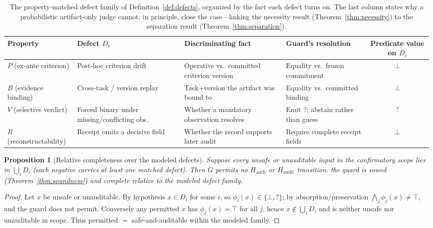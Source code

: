 \documentclass[sigconf,anonymous,review]{acmart}
\newtheorem{proposition}{Proposition}
\begin{document}
\begin{table}[t]
\centering
\footnotesize
\caption{The property-matched defect family of Definition~\ref{def:defects}, organized by the fact each defect turns on. The last column states why a probabilistic artifact-only judge cannot, in principle, close the case---linking the necessity result (Theorem~\ref{thm:necessity}) to the separation result (Theorem~\ref{thm:separation}).}
\label{tab:defects}
\begin{tabular}{@{}llllc@{}}
\toprule
Property & Defect $D_i$ & Discriminating fact & Guard's resolution & \shortstack{Predicate\\value on $D_i$} \\
\midrule
$P$ (ex-ante criterion) & Post-hoc criterion drift & Operative vs.\ committed criterion version & Equality vs.\ frozen commitment & $\bot$ \\
$B$ (evidence binding) & Cross-task / version replay & Task+version the artifact was bound to & Equality vs.\ committed binding & $\bot$ \\
$V$ (selective verdict) & Forced binary under missing/conflicting obs. & Whether a mandatory observation resolves & Emit $?$; abstain rather than guess & $?$ \\
$R$ (reconstructability) & Receipt omits a decisive field & Whether the record supports later audit & Require complete receipt fields & $\bot$ \\
\bottomrule
\end{tabular}
\end{table}

\begin{proposition}[Relative completeness over the modeled defects]
\label{prop:completeness}
Suppose every unsafe or unauditable input in the confirmatory scope lies in $\bigcup_{i}D_i$ (each negative carries at least one matched defect). Then $G$ permits no $H_{\mathrm{auth}}$ or $H_{\mathrm{audit}}$ transition: the guard is sound (Theorem~\ref{thm:soundness}) and complete relative to the modeled defect family.
\end{proposition}
\begin{proof}
Let $x$ be unsafe or unauditable. By hypothesis $x\in D_i$ for some $i$, so $\phi_i(x)\in\{\bot,?\}$; by absorption/preservation $\bigwedge_j\phi_j(x)\neq\top$, and the guard does not permit. Conversely any permitted $x$ has $\phi_j(x)=\top$ for all $j$, hence $x\notin\bigcup_iD_i$ and is neither unsafe nor unauditable in scope. Thus permitted $=$ safe-and-auditable within the modeled family.
\end{proof}
\end{document}
